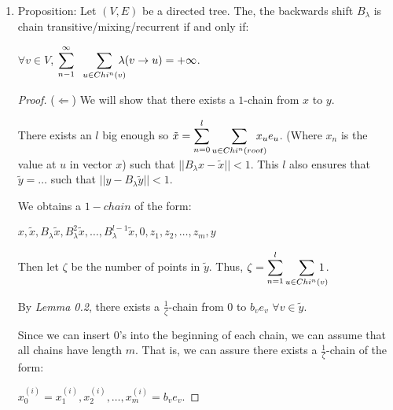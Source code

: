 \documentclass{article}
\begin{document}
\begin{enumerate}
\begin{proof}
    So, $z^{(m)}=0+\frac{b}{t}(\displaystyle\sum^{m-1}_{n=1}\sum_{u \in Chi^n(v)}\hspace{-0.4cm}\lambda(v\rightarrow u))e_v+\frac{b}{t}e_v$

    $=\frac{b}{t}(1+\displaystyle\sum^{m-1}_{n=1}\sum_{u \in Chi^n(v)}\lambda(v\rightarrow u))e_v=\frac{b}{t}\cdot t e_v=be_v$.
\end{proof}


\item Proposition: Let $(V,E)$ be a directed tree. The, the backwards shift $B_\lambda$ is chain transitive/mixing/recurrent if and only if:

\medskip

\centerline{$\forall v\in V$, $\displaystyle\sum^{\infty}_{n-1}
\hspace{0.2cm}\sum_{u\in Chi^n(v)}\hspace{-0.3cm}\lambda(v \rightarrow u) = +\infty$.}

\begin{proof}

($\Leftarrow$) We will show that there exists a $1$-chain from $x$ to $y$.

There exists an $l$ big enough so $\tilde{x}=\displaystyle\sum^l_{n=0} \sum_{u\in Chi^n(root)}\hspace{-0.4cm} x_u e_u$. 
(Where $x_n$ is the value at $u$ in vector $x$)
such that $||B_\lambda x-\tilde{x}||<1$. This $l$ also ensures that $\tilde{y}=\dots$ such that $||y-B_\lambda\tilde{y}||<1$.

We obtains a $1-chain$ of the form:

\medskip

\centerline{$x,\tilde{x},B_\lambda\tilde{x},B_\lambda^2\tilde{x},\dots,B_\lambda^{l-1}\tilde{x},0,z_1,z_2,\dots,z_m,y$}

\smallskip

Then let $\zeta$ be the number of points in $\tilde{y}$. Thus, $\zeta= \displaystyle\sum^l_{n=1}\sum_{u\in Chi^n(v)}\hspace{-0.35cm}1$.



By \textit{Lemma 0.2}, there exists a $\frac{1}{\zeta}$-chain from $0$ to $b_ve_v$ $\forall v\in\tilde{y}$.

Since we can insert $0$'s into the beginning of each chain, we can assume that all chains have length $m$. That is, we can assure there exists a $\frac{1}{\zeta}$-chain of the form:

\centerline{$x^{(i)}_0=x^{(i)}_1,x^{(i)}_2,\dots,x^{(i)}_m=b_ve_v$.}


\end{proof}
\end{enumerate}
\end{document}
